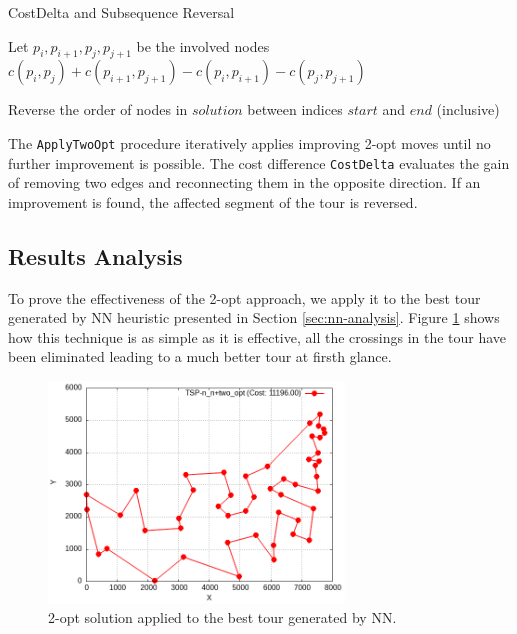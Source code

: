 \begin{algorithm}
\caption{CostDelta and Subsequence Reversal}
\label{alg:subroutines}
\begin{algorithmic}
    \State Let $p_i, p_{i+1}, p_j, p_{j+1}$ be the involved nodes
    \State \Return $c(p_i, p_j) + c(p_{i+1}, p_{j+1}) - c(p_i, p_{i+1}) - c(p_j, p_{j+1})$
\EndFunction

    \State Reverse the order of nodes in $solution$ between indices $start$ and $end$ (inclusive)
\EndProcedure
\end{algorithmic}
\end{algorithm}

The \texttt{ApplyTwoOpt} procedure iteratively applies improving 2-opt moves until no further improvement is possible. 
The cost difference \texttt{CostDelta} evaluates the gain of removing two edges and reconnecting them in the opposite direction. 
If an improvement is found, the affected segment of the tour is reversed.

\subsection{Results Analysis}
To prove the effectiveness of the 2-opt approach, we apply it to the best tour generated by NN heuristic presented in Section \ref{sec:nn-analysis}.
Figure \ref{fig:nn-2opt-example} shows how this technique is as simple as it is effective, all the crossings in the tour have been eliminated leading to a much better tour at firsth glance.

\begin{figure}[h!]
    \centering
    \includegraphics[width=0.7\textwidth]{images/TSP_n_n+two_opt.png}
    \caption{2-opt solution applied to the best tour generated by NN.}
    \label{fig:nn-2opt-example}
\end{figure}

